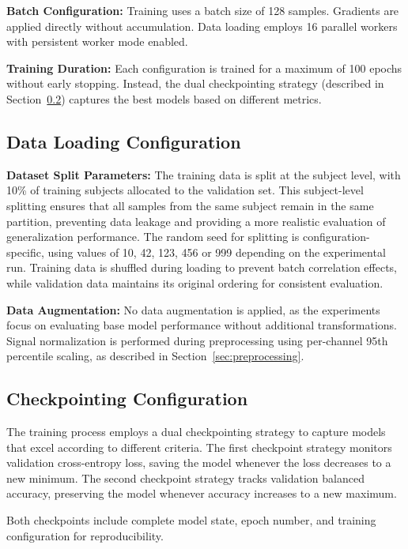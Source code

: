 \textbf{Batch Configuration:} Training uses a batch size of 128 samples. Gradients are applied directly without accumulation. Data loading employs 16 parallel workers with persistent worker mode enabled.

\textbf{Training Duration:} Each configuration is trained for a maximum of 100 epochs without early stopping. Instead, the dual checkpointing strategy (described in Section~\ref{sec:checkpointing_config}) captures the best models based on different metrics.

\subsection{Data Loading Configuration}
\label{sec:data_loading}

\textbf{Dataset Split Parameters:} The training data is split at the subject level, with 10\% of training subjects allocated to the validation set. This subject-level splitting ensures that all samples from the same subject remain in the same partition, preventing data leakage and providing a more realistic evaluation of generalization performance. The random seed for splitting is configuration-specific, using values of 10, 42, 123, 456 or 999 depending on the experimental run. Training data is shuffled during loading to prevent batch correlation effects, while validation data maintains its original ordering for consistent evaluation.

\textbf{Data Augmentation:} No data augmentation is applied, as the experiments focus on evaluating base model performance without additional transformations. Signal normalization is performed during preprocessing using per-channel 95th percentile scaling, as described in Section~\ref{sec:preprocessing}.

\subsection{Checkpointing Configuration}
\label{sec:checkpointing_config}

The training process employs a dual checkpointing strategy to capture models that excel according to different criteria. The first checkpoint strategy monitors validation cross-entropy loss, saving the model whenever the loss decreases to a new minimum. The second checkpoint strategy tracks validation balanced accuracy, preserving the model whenever accuracy increases to a new maximum.

Both checkpoints include complete model state, epoch number, and training configuration for reproducibility.

